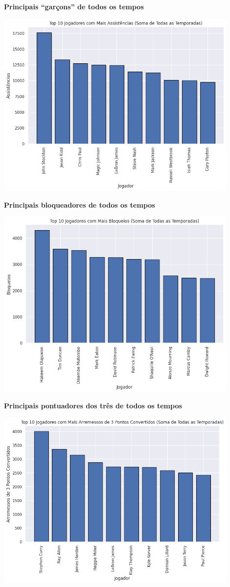\documentclass[
]{book}
\begin{document}
\textbf{Principais ``garçons'' de todos os tempos}

\includegraphics[width=0.9\textwidth,height=\textheight]{imagens/17.png}

\textbf{Principais bloqueadores de todos os tempos}

\includegraphics[width=0.9\textwidth,height=\textheight]{imagens/18.png}

\textbf{Principais pontuadores dos três de todos os tempos}

\includegraphics[width=0.9\textwidth,height=\textheight]{imagens/19.png}
\end{document}
